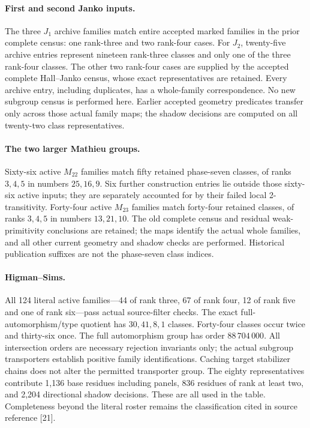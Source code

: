 \documentclass[11pt,a4paper]{article}
\begin{document}
\paragraph{First and second Janko inputs.}
The three $J_1$ archive families match entire accepted marked families
in the prior complete census: one rank-three and two rank-four cases.
For $J_2$, twenty-five archive entries represent nineteen rank-three
classes and only one of the three rank-four classes. The other two
rank-four cases are supplied by the accepted complete Hall--Janko census,
whose exact representatives are retained. Every archive entry, including
duplicates, has a whole-family correspondence. No new subgroup census
is performed here. Earlier accepted geometry predicates transfer only
across those actual family maps; the shadow decisions are computed on
all twenty-two class representatives.

\paragraph{The two larger Mathieu groups.}
Sixty-six active $M_{22}$ families match fifty retained phase-seven
classes, of ranks $3,4,5$ in numbers $25,16,9$. Six further construction
entries lie outside those sixty-six active inputs; they are separately
accounted for by their failed local 2-transitivity.
Forty-four active $M_{23}$ families match forty-four retained classes,
of ranks $3,4,5$ in numbers $13,21,10$. The old complete census and
residual weak-primitivity conclusions are retained; the maps identify
the actual whole families, and all other current geometry and shadow
checks are performed. Historical publication suffixes are not the
phase-seven class indices.

\paragraph{Higman--Sims.}
All 124 literal active families---44 of rank three, 67 of rank four,
12 of rank five and one of rank six---pass actual source-filter checks.
The exact full-automorphism/type quotient has $30,41,8,1$ classes.
Forty-four classes occur twice and thirty-six once. The full
automorphism group has order $88\,704\,000$. All intersection orders
are necessary rejection invariants only; the actual subgroup
transporters establish positive family identifications. Caching target
stabilizer chains does not alter the permitted transporter group.
The eighty representatives contribute 1,136 base residues including
panels, 836 residues of rank at least two, and 2,204 directional shadow
decisions. These are all used in the table. Completeness beyond the
literal roster remains the classification cited in source reference [21].
\end{document}
